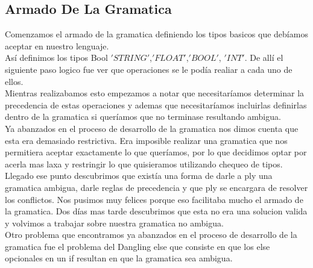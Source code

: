 \subsection{Armado De La Gramatica}
Comenzamos el armado de la gramatica definiendo los tipos basicos que debíamos aceptar en nuestro lenguaje.
\\
Así definimos los tipos Bool $'STRING'$,$'FLOAT'$,$'BOOL'$, $'INT'$. De allí el siguiente paso logico fue ver que operaciones se le podía realiar a cada uno de ellos.
\\
Mientras realizabamos esto empezamos a notar que necesitaríamos determinar la precedencia de estas operaciones y ademas que necesitaríamos incluirlas definirlas dentro de la gramatica si queríamos que no terminase resultando ambigua.
\\
Ya abanzados en el proceso de desarrollo de la gramatica nos dimos cuenta que esta era demasiado restrictiva. Era imposible realizar una gramatica que nos permitiera aceptar exactamente lo que queríamos, por lo que decidimos optar por acerla mas laxa y restringir lo que quisieramos utilizando chequeo de tipos.
\\
Llegado ese punto descubrimos que existía una forma de darle a ply una gramatica ambigua, darle reglas de precedencia y que ply se encargara de resolver los conflictos. Nos pusimos muy felices porque eso facilitaba mucho el armado de la gramatica. Dos días mas tarde descubrimos que esta no era una solucion valida y volvimos a trabajar sobre nuestra gramatica no ambigua.
\\
Otro problema que encontramos ya abanzados en el proceso de desarrollo de la gramatica fue el problema del Dangling else que consiste en que los else opcionales en un if resultan en que la gramatica sea ambigua. 